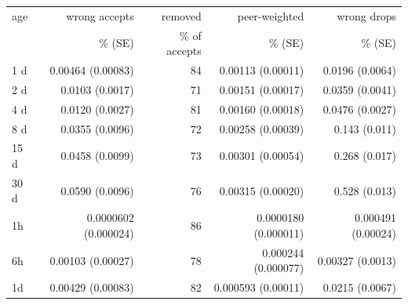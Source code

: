 \begin{tabular}{@{}lrrrr@{}}
\toprule
age & wrong accepts & removed & peer-weighted & wrong drops \\
    & \% (SE)       & \% of accepts & \% (SE) & \% (SE) \\
\midrule
1 d & 0.00464 (0.00083) & 84 & 0.00113 (0.00011) & 0.0196 (0.0064) \\
2 d & 0.0103 (0.0017) & 71 & 0.00151 (0.00017) & 0.0359 (0.0041) \\
4 d & 0.0120 (0.0027) & 81 & 0.00160 (0.00018) & 0.0476 (0.0027) \\
8 d & 0.0355 (0.0096) & 72 & 0.00258 (0.00039) & 0.143 (0.011) \\
15 d & 0.0458 (0.0099) & 73 & 0.00301 (0.00054) & 0.268 (0.017) \\
30 d & 0.0590 (0.0096) & 76 & 0.00315 (0.00020) & 0.528 (0.013) \\
\midrule
1h & 0.0000602 (0.000024) & 86 & 0.0000180 (0.000011) & 0.000491 (0.00024) \\
6h & 0.00103 (0.00027) & 78 & 0.000244 (0.000077) & 0.00327 (0.0013) \\
1d & 0.00429 (0.00083) & 82 & 0.000593 (0.00011) & 0.0215 (0.0067) \\
\bottomrule
\end{tabular}
